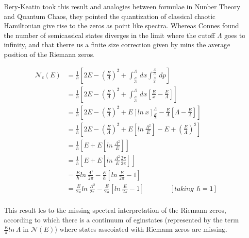 \documentclass[12pt, letterpaper]{article}
\newcommand*{\1}{\hspace{1pt}}
\begin{document}
    Bery-Keatin took this result and analogies between formulae in Nunber Theory and Quantum Chaos, they pointed the quantization of classical chaotic Hamiltonian give
    rise to the zeros as point like spectra.\cite{s1,s4} Whereas Connes found the number of semicassical states diverges in the limit where the cutoff $\Lambda$ goes to
    infinity, and that therre us a finite size correction given by mins the average position of the Riemann zeros.

    \begin{equation}
        \begin{split}
            \mathcal {N}_{c} (E) &= \frac{1}{h}\left[ 2E - \left(\frac{E}{\Lambda} \right)^{2} + \int_{\frac{E}{\Lambda}}^{\Lambda}  \,dx\int_{\frac{E}{x}}^{\frac{E}{\Lambda}}  \,dp   \right] \\ 
             & = \frac{1}{h}\left[ 2E - \left(\frac{E}{\Lambda} \right)^{2} + \int_{\frac{E}{\Lambda}}^{\Lambda}  \,dx\left[\frac{E}{x} - \frac{E}{\Lambda}\right]   \right] \\ 
             & = \frac{1}{h}\left[ 2E - \left(\frac{E}{\Lambda} \right)^{2} + E\left[ln \ x\right] _{\frac{E}{\Lambda}}^{\Lambda} - \frac{E}{\Lambda}\left[\Lambda - \frac{E}{\Lambda}\right]   \right] \\ 
             & = \frac{1}{h}\left[ 2E - \left(\frac{E}{\Lambda} \right)^{2} + E\left[ln \ \frac{\Lambda ^{2}}{E}\right] - E + \left(\frac{E}{\Lambda}\right)^{2}\right]  \\ 
             & = \frac{1}{h}\left[ E  + E\left[ln \ \frac{\Lambda ^{2}}{E}\right] \right]  \\ 
             & = \frac{1}{h}\left[ E  + E\left[ln \ \frac{\Lambda ^{2}}{E}\frac{2\pi}{2\pi}\right] \right]  \\ 
             & = \frac{E}{h} ln \ \frac{\Lambda ^{2}}{2\pi} - \frac{E}{h} \left[ln \ \frac{E}{2\pi} - 1\right]  \\
             & = \frac{E}{2\pi} ln \ \frac{\Lambda ^{2}}{2\pi} - \frac{E}{2\pi} \left[ln \ \frac{E}{2\pi} - 1\right] \ \ \ \ \ \ \ \ \ \ \ \ \ \ \ \ \   [taking \ \ \hbar=1] \\
        \end{split} 
    \end{equation}

    This result les to the missing spectral interpretation of the Riemann zeros, according to which there is a continuum of eginstates (represented by the term $\frac{E}{\pi}
     ln \ \Lambda$ in $\mathcal {N} (E)$) where states asscoiated with Riemann zeros are missing.
\end{document}
